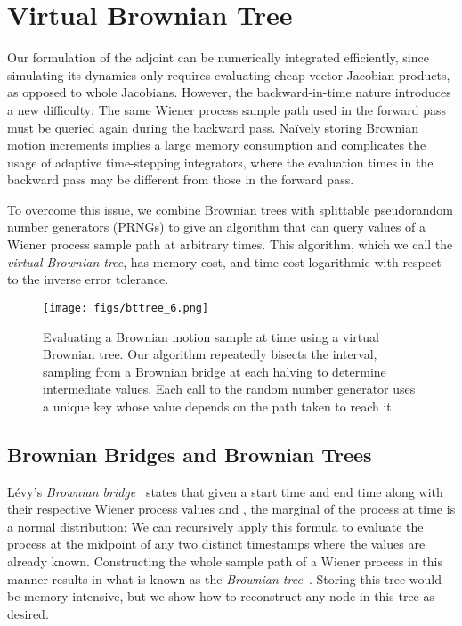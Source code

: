 \documentclass[twoside]{article}
\begin{document}
\section{Virtual Brownian Tree}\label{sec:tree}
Our formulation of the adjoint can be numerically integrated efficiently, since simulating its dynamics only requires evaluating cheap vector-Jacobian products, as opposed to whole Jacobians.
However, the backward-in-time nature introduces a new difficulty:
The same Wiener process sample path used in the forward pass must be queried again during the backward pass.
Na\"ively storing Brownian motion increments 
implies a large memory consumption and complicates the usage of adaptive time-stepping integrators, where the evaluation times in the backward pass may be different from those in the forward pass. 

To overcome this issue, we combine Brownian trees with splittable pseudorandom number generators (PRNGs) to give an algorithm that can query values of a Wiener process sample path at arbitrary times.
This algorithm, which we call the \emph{virtual Brownian tree}, has  memory cost, and time cost logarithmic with respect to the inverse error tolerance.

\begin{figure}[ht]
{\texttt{[image: figs/bttree\_6.png]}}
\caption{
Evaluating a Brownian motion sample at time  using a virtual Brownian tree.
Our algorithm repeatedly bisects the interval, sampling from a Brownian bridge at each halving to determine intermediate values.
Each call to the random number generator uses a unique key whose value depends on the path taken to reach it.
}
\end{figure}

\subsection{Brownian Bridges and Brownian Trees}
L\'evy's \textit{Brownian bridge}~\citep{revuz2013continuous} states that given a start time  and end time  along with their respective Wiener process values  and , the marginal of the process at time  is a normal distribution:
We can recursively apply this formula to evaluate the process at the midpoint of any two distinct timestamps where the values are already known. Constructing the whole sample path of a Wiener process in this manner results in what is known as the \textit{Brownian tree}~\citep{gaines1997variable}.
Storing this tree would be memory-intensive, but we show how to reconstruct any node in this tree as desired.
\end{document}
